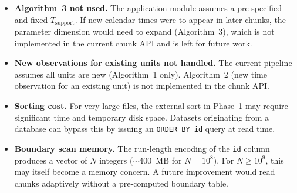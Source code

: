 \documentclass[11pt, a4paper]{article}
\begin{document}
\begin{itemize}
  \item \textbf{Algorithm~3 not used.}  The application module assumes a
        pre-specified and fixed $T_{\mathrm{support}}$.  If new calendar times
        were to appear in later chunks, the parameter dimension would need to
        expand (Algorithm~3), which is not implemented in the current chunk API
        and is left for future work.

  \item \textbf{New observations for existing units not handled.}
        The current pipeline assumes all units are new (Algorithm~1 only).
        Algorithm~2 (new time observation for an existing unit) is not
        implemented in the chunk API.

  \item \textbf{Sorting cost.}  For very large files, the external sort in
        Phase~1 may require significant time and temporary disk space.
        Datasets originating from a database can bypass this by issuing an
        \texttt{ORDER BY id} query at read time.

  \item \textbf{Boundary scan memory.}  The run-length encoding of the
        \texttt{id} column produces a vector of $N$ integers ($\sim$400~MB for
        $N = 10^8$).  For $N \geq 10^9$, this may itself become a memory
        concern.  A future improvement would read chunks adaptively without a
        pre-computed boundary table.
\end{itemize}
\end{document}
